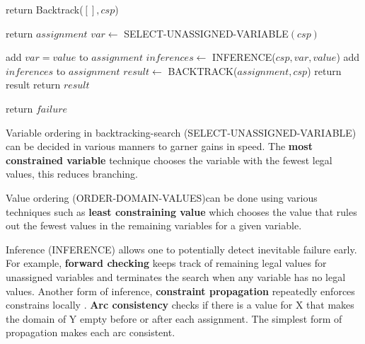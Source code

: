 \documentclass{article}
\begin{document}
\begin{algorithm}
\begin{algorithmic}

    \State return Backtrack($[],csp$)
\EndProcedure


    \State return $assignment$
\EndIf
\State $var \leftarrow$ SELECT-UNASSIGNED-VARIABLE$(csp)$

        \State add {$var = value$} to $assignment$
        \State $inferences \leftarrow$ INFERENCE($csp,var,value$)
            \State add $inferences$ to $assignment$
            \State $result \leftarrow $ BACKTRACK($assignment,csp$)
                        \State return result
                    \EndIf
                \EndIf
            \EndIf
    \State return $result$

\EndFor

\State return $failure$

\EndProcedure

\end{algorithmic}
\end{algorithm}

Variable ordering in backtracking-search (SELECT-UNASSIGNED-VARIABLE) can be decided in various manners to garner gains in speed. The \textbf{most constrained variable} technique chooses the variable with the fewest legal values, this reduces branching. \newline

Value ordering (ORDER-DOMAIN-VALUES)can be done using various techniques such as \textbf{least constraining value} which chooses the value that rules out the fewest values in the remaining variables for a given variable. \newline 

Inference (INFERENCE) allows one to potentially detect inevitable failure early. For example, \textbf{forward checking} keeps track of remaining legal values for unassigned variables and terminates the search when any variable has no legal values. Another form of inference, \textbf{constraint propagation} repeatedly enforces constrains locally . \newline \textbf{Arc consistency} checks if there is a value for X that makes the domain of Y empty before or after each assignment. The simplest form of propagation makes each arc consistent.
\end{document}
